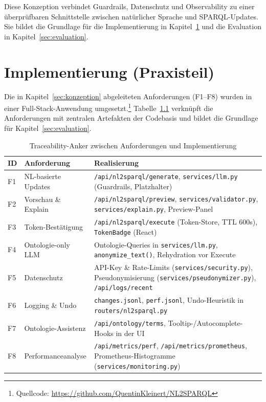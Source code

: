 \medskip
Diese Konzeption verbindet Guardrails, Datenschutz und Observability zu einer überprüfbaren Schnittstelle zwischen natürlicher Sprache und SPARQL-Updates. Sie bildet die Grundlage für die Implementierung in Kapitel~\ref{sec:implementierung} und die Evaluation in Kapitel~\ref{sec:evaluation}.







\chapter{Implementierung (Praxisteil)}
\label{sec:implementierung}

Die in Kapitel~\ref{sec:konzeption} abgeleiteten Anforderungen (F1–F8) wurden in einer Full-Stack-Anwendung umgesetzt.\footnote{Quellcode: \url{https://github.com/QuentinKleinert/NL2SPARQL}} Tabelle~\ref{tab:traceability-anforderungen} verknüpft die Anforderungen mit zentralen Artefakten der Codebasis und bildet die Grundlage für Kapitel~\ref{sec:evaluation}.

\begin{table}[ht]
  \centering
  \caption{Traceability-Anker zwischen Anforderungen und Implementierung}
  \label{tab:traceability-anforderungen}
  \begin{tabular}{p{}p{}p{}}
    \toprule
    \textbf{ID} & \textbf{Anforderung} & \textbf{Realisierung} \\
    \midrule
    F1 & NL-basierte Updates & \texttt{/api/nl2sparql/generate}, \texttt{services/llm.py} (Guardrails, Platzhalter) \\
    F2 & Vorschau \& Explain & \texttt{/api/nl2sparql/preview}, \texttt{services/validator.py}, \texttt{services/explain.py}, Preview-Panel \\
    F3 & Token-Bestätigung & \texttt{/api/nl2sparql/execute} (Token-Store, TTL 600s), \texttt{TokenBadge} (React) \\
    F4 & Ontologie-only LLM & Ontologie-Queries in \texttt{services/llm.py}, \texttt{anonymize\_text()}, Rehydration vor Execute \\
    F5 & Datenschutz & API-Key \& Rate-Limits (\texttt{services/security.py}), Pseudonymisierung (\texttt{services/pseudonymizer.py}), \texttt{/api/logs/recent} \\
    F6 & Logging \& Undo & \texttt{changes.jsonl}, \texttt{perf.jsonl}, Undo-Heuristik in \texttt{routers/nl2sparql.py} \\
    F7 & Ontologie-Assistenz & \texttt{/api/ontology/terms}, Tooltip-/Autocomplete-Hooks in der UI \\
    F8 & Performanceanalyse & \texttt{/api/metrics/perf}, \texttt{/api/metrics/prometheus}, Prometheus-Histogramme (\texttt{services/monitoring.py}) \\
    \bottomrule
  \end{tabular}
\end{table}

